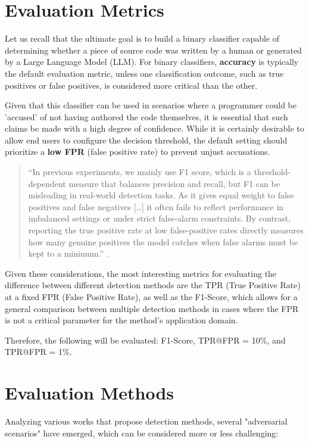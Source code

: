 \section{Evaluation Metrics}
\label{Evaluation Metrics}
Let us recall that the ultimate goal is to build a 
binary classifier capable of determining whether a piece 
of source code was written by a human or generated by a 
Large Language Model (LLM). For binary classifiers, 
\textbf{accuracy} is typically the default evaluation 
metric, unless one classification outcome, such as true 
positives or false positives, is considered more critical 
than the other. 

Given that this classifier can be used 
in scenarios where a programmer could be 'accused' of 
not having authored the code themselves, it is essential 
that such claims be made with a high degree of confidence. 
While it is certainly desirable to allow end users to 
configure the decision threshold, the default setting 
should prioritize a \textbf{low FPR} (false positive rate) 
to prevent unjust accusations.
\begin{quote}
    “In previous experiments, we mainly use F1 score, 
    which is a threshold-dependent measure that balances 
    precision and recall, but F1 can be misleading in 
    real-world detection tasks. As it gives equal weight 
    to false positives and false negatives […] it often 
    fails to reflect performance in imbalanced settings or 
    under strict false-alarm constraints. By contrast, 
    reporting the true positive rate at low false-positive 
    rates directly measures how many genuine positives the 
    model catches when false alarms must be kept to a minimum.”
    \cite{guo2025codemirage}.
\end{quote}


Given these considerations, the most interesting metrics for evaluating 
the difference between different detection methods are the 
TPR (True Positive Rate) at a fixed FPR (False Positive Rate), 
as well as the F1-Score, which allows for a general comparison 
between multiple detection methods in cases where the FPR is not a 
critical parameter for the method's application domain.

Therefore, the following will be evaluated: F1-Score, TPR@FPR = 10\%, and TPR@FPR = 1\%.


\section{Evaluation Methods}
Analyzing various works that propose detection methods, several 
"adversarial scenarios" have emerged, which can be considered more or less challenging:

